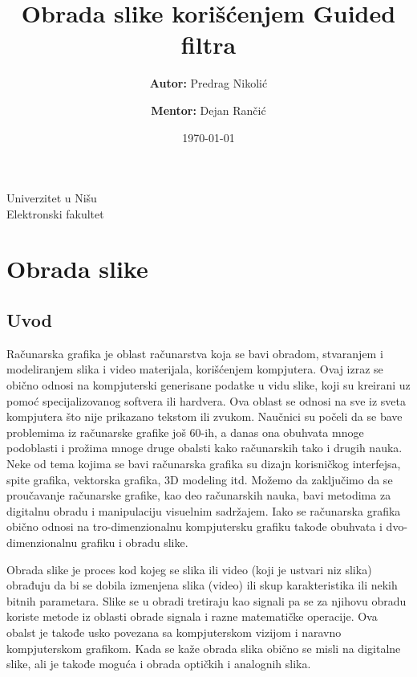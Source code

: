 \documentclass[a4paper,12pt,titlepage]{article}
\title{\Huge {\textbf{Obrada slike korišćenjem Guided filtra}}}
\author{\textbf{Autor:} Predrag Nikolić \and \textbf{Mentor:} Dejan Rančić}
\date{\today}
\begin{document}
\begin{center}
\large Univerzitet u Nišu \\ Elektronski fakultet
\end{center}

\begin{minipage}{\textwidth}
   \maketitle
\end{minipage}
\thispagestyle{empty}
\newpage

\tableofcontents
\thispagestyle{empty}
\newpage

\section{Obrada slike}%

\subsection{Uvod}%

Računarska grafika je oblast računarstva koja se bavi obradom, stvaranjem i modeliranjem slika i video materijala, korišćenjem kompjutera. 
Ovaj izraz se obično odnosi na kompjuterski generisane podatke u vidu slike, koji su kreirani uz pomoć specijalizovanog softvera ili hardvera.
Ova oblast se odnosi na sve iz sveta kompjutera što nije prikazano tekstom ili zvukom.
Naučnici su počeli da se bave problemima iz računarske grafike još 60-ih, a danas ona obuhvata mnoge podoblasti i prožima mnoge druge
obalsti kako računarskih tako i drugih nauka. Neke od tema kojima se bavi računarska grafika su dizajn korisničkog interfejsa, spite grafika, vektorska grafika, 3D modeling itd. Možemo da zaključimo da se proučavanje računarske grafike, kao deo računarskih nauka, bavi metodima
za digitalnu obradu i manipulaciju visuelnim sadržajem. Iako se računarska grafika obično odnosi na tro-dimenzionalnu kompjutersku grafiku
takođe obuhvata i dvo-dimenzionalnu grafiku i obradu slike. 

Obrada slike je proces kod kojeg se slika ili video (koji je ustvari niz slika) obrađuju da bi se dobila izmenjena slika (video) ili skup karakteristika
ili nekih bitnih parametara. Slike se u obradi tretiraju kao signali pa se za njihovu obradu koriste metode iz oblasti obrade signala i razne matematičke operacije. Ova obalst je takođe usko povezana sa kompjuterskom vizijom i naravno kompjuterskom grafikom. Kada se kaže obrada slika obično se misli na digitalne slike, ali je takođe moguća i obrada optičkih i analognih slika. 
\end{document}

